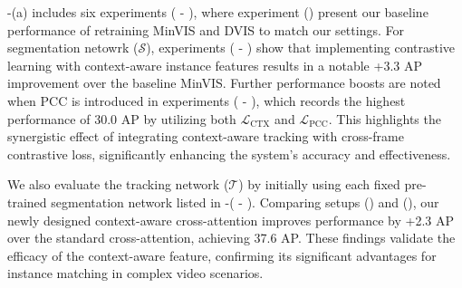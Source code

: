 \documentclass[10pt,twocolumn,letterpaper]{article}
\begin{document}
-(a) includes six experiments ( - ), where experiment () present our baseline performance of retraining MinVIS \citep{huang2022minvis} and DVIS \citep{DVIS} to match our settings.
For segmentation netowrk ($\mathcal{S}$), experiments ( - ) show that implementing contrastive learning with context-aware instance features results in a notable +3.3 AP improvement over the baseline MinVIS.
Further performance boosts are noted when PCC is introduced in experiments ( - ), which records the highest performance of 30.0 AP by utilizing both $\mathcal{L}_{\text{CTX}}$ and $\mathcal{L}_{\text{PCC}}$. This highlights the synergistic effect of integrating context-aware tracking with cross-frame contrastive loss, significantly enhancing the system's accuracy and effectiveness.


We also evaluate the tracking network ($\mathcal{T}$) by initially using each fixed pre-trained segmentation network listed in -( - ). Comparing setups () and (), our newly designed context-aware cross-attention improves performance by +2.3 AP over the standard cross-attention, achieving 37.6 AP. These findings validate the efficacy of the context-aware feature, confirming its significant advantages for instance matching in complex video scenarios.



% 



% 
% 
% 
% 
% 
\end{document}
